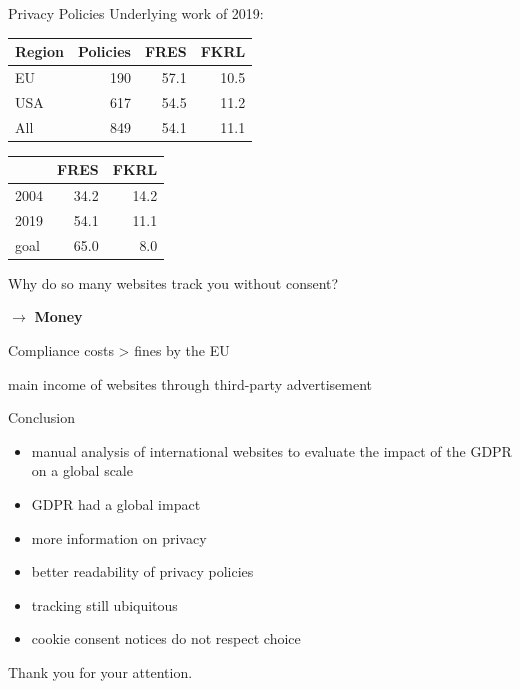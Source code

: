 \documentclass[xcolor={dvipsnames}]{beamer}
\begin{document}
\begin{frame}{Privacy Policies}
    Underlying work of 2019:\\
    \vspace{.5em}
    \centering
    \begin{tabular}{ l r r r }
        \hline
        Region & Policies & FRES & FKRL \\
        \hline
        EU & 190 & 57.1 & 10.5 \\
        USA & 617 & 54.5 & 11.2 \\
        All & 849 & 54.1 & 11.1 \\
        \hline
    \end{tabular}

    \vspace{1em}

    \begin{tabular}{ l r r }
        \hline
        & FRES & FKRL \\
        \hline
        2004 & 34.2 & 14.2 \\
        2019 & 54.1 & 11.1 \\
        goal & 65.0 & 8.0 \\
        \hline
    \end{tabular}
\end{frame}

\begin{frame}
    \centering
    Why do so many websites track you without consent?

    \pause
    $\rightarrow$ \textbf{Money}

    \pause
    Compliance costs > fines by the EU

    main income of websites through third-party advertisement
\end{frame}

\begin{frame}{Conclusion}
    \begin{itemize}
        \item manual analysis of international websites to evaluate the impact of the GDPR on a global scale
        \item GDPR had a global impact
        \item more information on privacy
        \item better readability of privacy policies
        \item tracking still ubiquitous
        \item cookie consent notices do not respect choice
    \end{itemize}
    \pause
    \centering
    \LARGE
    Thank you for your attention.
\end{frame}
\end{document}
